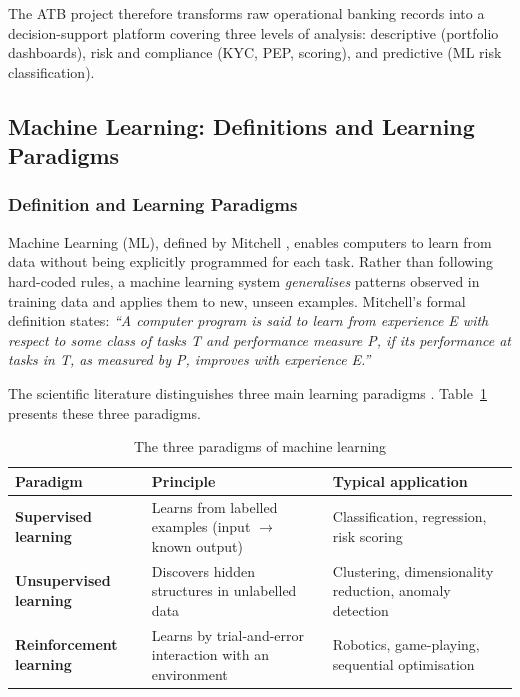 The ATB project therefore transforms raw operational banking records into a decision-support
platform covering three levels of analysis: descriptive (portfolio dashboards), risk and
compliance (KYC, PEP, scoring), and predictive (ML risk classification).

\subsection{Machine Learning: Definitions and Learning Paradigms}

\subsubsection{Definition and Learning Paradigms}

Machine Learning (ML), defined by Mitchell \cite{mitchell1997}, enables computers to learn
from data without being explicitly programmed for each task. Rather than following hard-coded
rules, a machine learning system \textit{generalises} patterns observed in training data and
applies them to new, unseen examples. Mitchell's formal definition states:
\textit{``A computer program is said to learn from experience E with respect to some class of
tasks T and performance measure P, if its performance at tasks in T, as measured by P,
improves with experience E.''} \cite{mitchell1997}

The scientific literature distinguishes three main learning paradigms
\cite{hastie2009, bishop2006}. Table~\ref{tab:ml_paradigms_general} presents these three
paradigms.

\begin{table}[H]
\centering
\small
\caption{The three paradigms of machine learning}
\label{tab:ml_paradigms_general}
\begin{tabular}{|p{3.5cm}|p{4.5cm}|p{4.5cm}|}
\hline
\rowcolor{blue!15}
\textbf{Paradigm} & \textbf{Principle} & \textbf{Typical application} \\
\hline
\textbf{Supervised learning} & Learns from labelled examples
(input $\to$ known output) & Classification, regression, risk scoring \\
\hline
\textbf{Unsupervised learning} & Discovers hidden structures in
unlabelled data & Clustering, dimensionality reduction, anomaly detection \\
\hline
\textbf{Reinforcement learning} & Learns by trial-and-error interaction
with an environment & Robotics, game-playing, sequential optimisation \\
\hline
\end{tabular}
\end{table}


